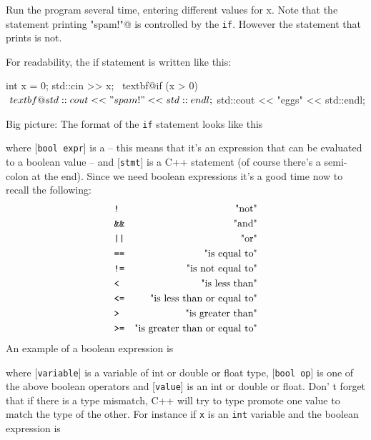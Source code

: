 Run the program several time, entering different values for x. Note that
the statement printing \verb@"spam!"@ is controlled by the \verb!if!.
However the statement that prints  is not.

For readability, the if statement is written like this:\\
\begin{console}[commandchars=\~\@\$]
int x = 0;
std::cin >> x;
~textbf@if (x > 0)$
   ~textbf@std::cout << "spam!" << std::endl;$
std::cout << "eggs" << std::endl;
\end{console}
Big picture: The format of the \texttt{if} statement looks like this
\begin{center}

\EMPHASIZE{[stmt]}
\end{center}
where [\verb!bool expr!] is a  -- this
means that it's an expression that can be evaluated to a
boolean value -- and [\verb!stmt!] is a C++ statement (of course
there's a semi-colon at the end). Since we need boolean
expressions it's a good time now to recall the
following:
\begin{align*}
 & \texttt{!} & \text{"not"}\\
 & \texttt{\&\&} & \text{"and"}\\
 & \texttt{\textbar\textbar{}} & \text{"or"}\\
 & \texttt{==} & \text{"is equal to"}\\
 & \texttt{!=} & \text{"is not equal to"}\\
 & \texttt{\textless{}} & \text{"is less than"}\\
 & \texttt{\textless=} & \text{"is less than or equal to"}\\
 & \texttt{>} & \text{"is greater than"}\\
 & \texttt{>=} & \text{"is greater than or equal to"}\\
\end{align*}
An example of a boolean expression is

\EMPHASIZE{[variable] [bool op] [value]}

where [\verb!variable!] is a variable of int or double or float type, [\verb!bool op!] is one of the above boolean operators and [\verb!value!] is
an int or double or float. Don' t forget that if there is
a type mismatch, C++ will try to type promote one value to match the
type of the other. For instance if \verb!x! is an \verb!int! variable
and the boolean expression is

